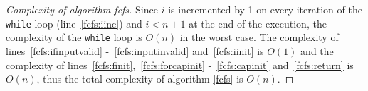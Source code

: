 \begin{proof}[Complexity of algorithm fcfs]
   Since $i$ is incremented by 1 on every iteration of the \texttt{while} loop (line~\ref{fcfs:iinc}) and $i < n+1$ at the
   end of the execution, the complexity of the \texttt{while} loop is $O\left(n\right)$ in the worst case. The complexity of
   lines~\ref{fcfs:ifinputvalid} -~\ref{fcfs:inputinvalid} and~\ref{fcfs:iinit} is $O\left(1\right)$ and the complexity of
   lines~\ref{fcfs:finit},~\ref{fcfs:forcapinit} -~\ref{fcfs:capinit} and~\ref{fcfs:return} is $O\left(n\right)$, thus the
   total complexity of algorithm \ref{fcfs} is $O\left(n\right)$.
\end{proof}
